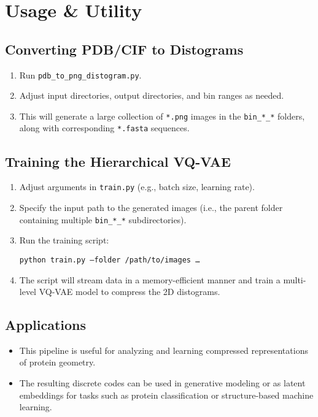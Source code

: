 \documentclass[11pt]{article}
\begin{document}
\section{Usage \& Utility}

\subsection{Converting PDB/CIF to Distograms}

\begin{enumerate}
  \item Run \texttt{pdb\_to\_png\_distogram.py}.
  \item Adjust input directories, output directories, and bin ranges as needed.
  \item This will generate a large collection of \texttt{*.png} images in the \texttt{bin\_*_*} folders, along with corresponding \texttt{*.fasta} sequences.
\end{enumerate}

\subsection{Training the Hierarchical VQ-VAE}

\begin{enumerate}
  \item Adjust arguments in \texttt{train.py} (e.g., batch size, learning rate).
  \item Specify the input path to the generated images (i.e., the parent folder containing multiple \texttt{bin\_*_*} subdirectories).
  \item Run the training script:
    \begin{center}
      \texttt{python train.py --folder /path/to/images \ldots}
    \end{center}
  \item The script will stream data in a memory-efficient manner and train a multi-level VQ-VAE model to compress the 2D distograms.
\end{enumerate}

\subsection{Applications}

\begin{itemize}
  \item This pipeline is useful for analyzing and learning compressed representations of protein geometry.
  \item The resulting discrete codes can be used in generative modeling or as latent embeddings for tasks such as protein classification or structure-based machine learning.
\end{itemize}
\end{document}
